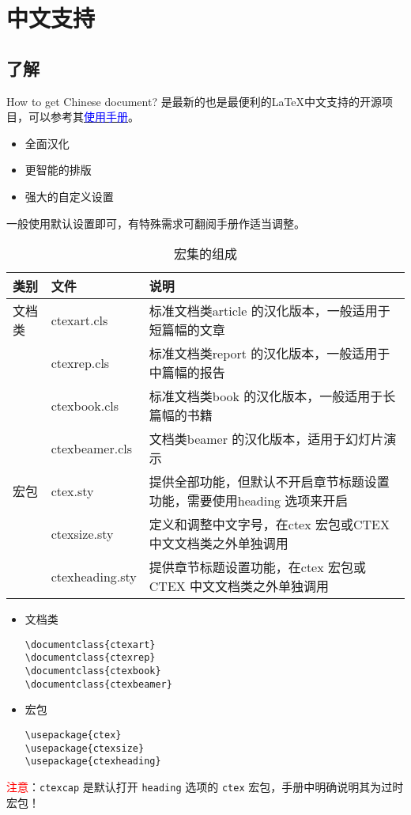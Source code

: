 \section{中文支持}
\subsection{了解\CTeX}
\begin{frame}{How to get Chinese document?}{\CTeX}
	\CTeX 是最新的也是最便利的\LaTeX 中文支持的开源项目，可以参考其\href{material/LM/CTEXmanual.pdf}{\textcolor{blue}{使用手册}}。
	\begin{itemize}
		\item 全面汉化
		\item 更智能的排版
		\item 强大的自定义设置
	\end{itemize}
	一般使用默认设置即可，有特殊需求可翻阅手册作适当调整。
\end{frame}
\begin{frame}
	\begin{table}\caption{\CTeX 宏集的组成}
		\footnotesize
		\begin{tabular}{llp{6cm}}
			\toprule
			类别 & 文件 & 说明 \\
			\midrule
			文档类 & ctexart.cls & 标准文档类article 的汉化版本，一般适用于短篇幅的文章\\
			& ctexrep.cls & 标准文档类report 的汉化版本，一般适用于中篇幅的报告\\
			& ctexbook.cls & 标准文档类book 的汉化版本，一般适用于长篇幅的书籍\\
			& ctexbeamer.cls & 文档类beamer 的汉化版本，适用于幻灯片演示\\
			\midrule
			宏包 & ctex.sty & 提供全部功能，但默认不开启章节标题设置功能，需要使用heading 选项来开启\\
			& ctexsize.sty & 定义和调整中文字号，在ctex 宏包或CTEX 中文文档类之外单独调用\\
			& ctexheading.sty & 提供章节标题设置功能，在ctex 宏包或CTEX 中文文档类之外单独调用\\
			\bottomrule
		\end{tabular}
	\end{table}
\end{frame}
\begin{frame}[fragile]
	\begin{itemize}
		\item 文档类
\begin{lstlisting}
\documentclass{ctexart}
\documentclass{ctexrep}
\documentclass{ctexbook}
\documentclass{ctexbeamer}
\end{lstlisting}		
		\item 宏包
\begin{lstlisting}
\usepackage{ctex}
\usepackage{ctexsize}      
\usepackage{ctexheading}   
\end{lstlisting}
	\end{itemize}
	\vspace{2ex}
	\textcolor{red}{注意}：\texttt{ctexcap} 是默认打开 \texttt{heading} 选项的 \texttt{ctex} 宏包，手册中明确说明其为过时宏包！
\end{frame}
